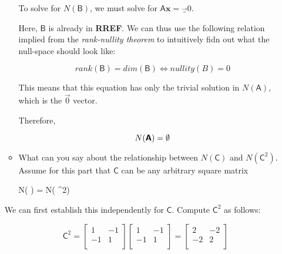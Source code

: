 \documentclass[a4paper, 11pt]{article}
\newcommand{\mat}[1]{\boldsymbol { \mathsf{#1}} }
\begin{document}
\begin{enumerate}
\begin{itemize}
	      To solve for $N(\mat{B})$, we must solve for $\mat{A}\textbf{x} = \vec_{0}$.
	      
	      Here, $\mat{B}$ is already in \textbf{RREF}. We can thus use the following relation implied from the \textit{rank-nullity theorem} to intuitively fidn out what the null-space should look like:
	      
	      \begin{equation*}
	      	rank(\mat{B}) = dim(\mat{B}) \iff nullity(B) = 0
	      \end{equation*}
	      
	     This means that this equation has only the trivial solution in $N(\mat{A})$, which is the $\vec{0}$ vector.
	     
	     Therefore,
	     
	     \begin{equation*}
	     	N(\mat{A}) = \emptyset \\ 
	     \end{equation*}
	      
	      \item What can you say about the relationship between $N(\mat C)$ and $N(\mat C^2)$. Assume for this part that $\mat C$ can be any arbitrary square matrix
	      
	      \begin{*equation}
	        N(\mat C) = N(\mat C^2) \\
	      \end{*equation}
	      
	    \end{itemize}
	    
	    We can first establish this independently for $\mat{C}$. Compute $\mat{C}^2$ as follows:
	    
	    \begin{center}
	        $$\mat{C}^2 = 
	        \begin{bmatrix}
	        1 & -1 \\
	        -1 & 1 \\
	        \end{bmatrix}
	        \begin{bmatrix}
	        1 & -1 \\
	        -1 & 1 \\
	        \end{bmatrix}
	        =
	        \begin{bmatrix}
	        2 & -2 \\
	        -2 & 2 \\
	        \end{bmatrix}$$
	    \end{center}
	    

\end{enumerate}
\end{document}
